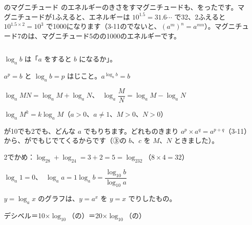 \begin{column}{のマグニチュード}
のエネルギーのきさをすマグニチュードも、をったです。マグニチュードが1ふえると、エネルギーは $10^{1.5}=31.6\cdots$ で32、2ふえると $10^{1.5\times2}=10^3$ で1000になります（3-11のでないと、$(a^m)^n=a^{mn}$）。マグニチュード7のは、マグニチュード5のの1000のエネルギーです。
\end{column}

\begin{taisetsu}
$\log_ab$ は「$a$ をすると $b$ になるか」。\par
\hspace*{1\zw}$a^p=b$ と $\log_ab=p$ はじこと。\quad $a^{\log_ab}=b$\par\vspace{2pt}
$\log_aMN=\log_aM+\log_aN$、\ $\log_a\dfrac{M}{N}=\log_aM-\log_aN$\par\vspace{2pt}
$\log_aM^k=k\log_aM$\quad（$a>0$、$a\neq1$、$M>0$、$N>0$）\par\vspace{1pt}
{\mdseries\small {}が10でも2でも、どんな $a$ でもりちます。どれものきまり $a^p\times a^q=a^{p+q}$（3-11）から、がでもじでてくるからです（③の $b$、$c$ を $M$、$N$ ときました）。\par
{}2でかめ：$\log_28+\log_24=3+2=5=\log_232$（$8\times4=32$）\par}\vspace{2pt}
$\log_a1=0$、\ $\log_aa=1$\qquad $\log_ab=\dfrac{\log_{10}b}{\log_{10}a}$\par\vspace{2pt}
$y=\log_ax$ のグラフは、$y=a^x$ を $y=x$ でりしたもの。\par\vspace{2pt}
デシベル＝10×$\log_{10}$（の）＝20×$\log_{10}$（の）
\end{taisetsu}

\begin{kotoba}
\small
{}
\end{kotoba}

